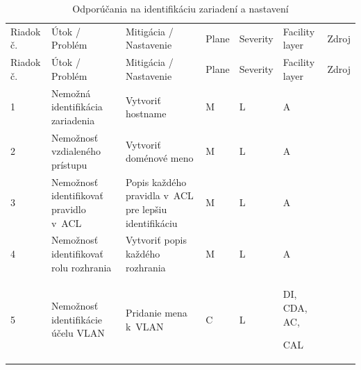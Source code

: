 \begin{longtable}[!htbp]{|C{2.5em}L{11em}L{11em}C{2.5em}C{4em}C{5em}L{2.5em}|}
	\caption{Odporúčania na identifikáciu zariadení a nastavení}
	\label{tab:identification}\\ \hline
	\mbox{Riadok} č.&Útok / Problém	&Mitigácia / Nastavenie	&Plane	&Severity	&Facility layer	&Zdroj\\ \hhline{=======}
	\endfirsthead 
	\hline
	\centering
	
	Riadok č.	&Útok / Problém	&Mitigácia / Nastavenie	&Plane	&Severity	&Facility layer	&Zdroj\\ \hhline{=======}
	\endhead
	
	 1	&Nemožná identifikácia zariadenia	&Vytvoriť hostname	&M	&L	&A	& \cite{CIS_DrTLsgXv24lxeIIM}\\
	2	&Nemožnosť vzdialeného prístupu	&Vytvoriť doménové meno	&M	&L	&A	& \cite{CIS_DrTLsgXv24lxeIIM}\\
	 3	&Nemožnosť identifikovať pravidlo v~ACL	&Popis každého pravidla v~ACL pre lepšiu identifikáciu	&M	&L	&A	& \cite{Singh2018}\\
	4	&Nemožnosť identifikovať rolu rozhrania	&Vytvoriť popis každého rozhrania	&M	&L	&A	& \cite{Lammle2013}\\
	 5	&Nemožnosť identifikácie účelu VLAN	&Pridanie mena k~VLAN	&C	&L	&DI,
	CDA,
	AC,
	
	CAL	& \cite{Lammle2013}\\	
	\hline
\end{longtable}%

